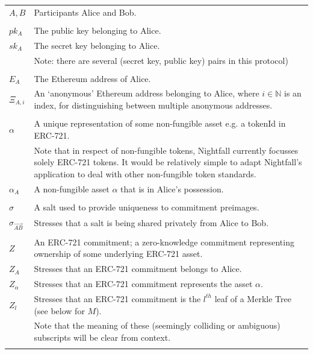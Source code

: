 \documentclass{article}
\begin{document}
\begin{center}
	\begin{tabular}{lp{14cm}}
    $A, B$      & Participants Alice and Bob.\\
    \\
    $pk_A$      & The public key belonging to Alice.\\
    $sk_A$      & The secret key belonging to Alice.\\
                & Note: there are several (secret key, public key) pairs in this protocol)\\
    \\
		$E_A$       & The Ethereum address of Alice.\\
		$\Xi_{A,i}$ & An `anonymous' Ethereum address belonging to Alice, where $i\in\mathbb{N}$ is an index, for distinguishing between multiple anonymous addresses. \\
    \\
    $\alpha$    & A unique representation of some non-fungible asset e.g. a tokenId in ERC-721.\\
                & Note that in respect of non-fungible tokens, Nightfall currently focusses solely ERC-721 tokens.
                  It would be relatively simple to adapt Nightfall's application to deal with other non-fungible token standards.\\
    $\alpha_A$  & A non-fungible asset $\alpha$ that is in Alice's possession. \\
    \\
		$\sigma$      & A salt used to provide uniqueness to commitment preimages.\\
		$\sigma_{\vec{AB}}$ & Stresses that a salt is being shared privately from Alice to Bob.\\
    \\
		$Z$         & An ERC-721 commitment; a zero-knowledge commitment representing ownership of some underlying ERC-721 asset. \\
    $Z_A$       & Stresses that an ERC-721 commitment belongs to Alice.\\
    $Z_{\alpha}$ & Stresses that an ERC-721 commitment represents the asset $\alpha$.\\
    $Z_{l}$     & Stresses that an ERC-721 commitment is the $l^{th}$ leaf of a Merkle Tree (see below for $M$).\\
                & Note that the meaning of these (seemingly colliding or ambiguous) subscripts will be clear from context.\\
    \\

\end{tabular}
\end{center}
\end{document}
